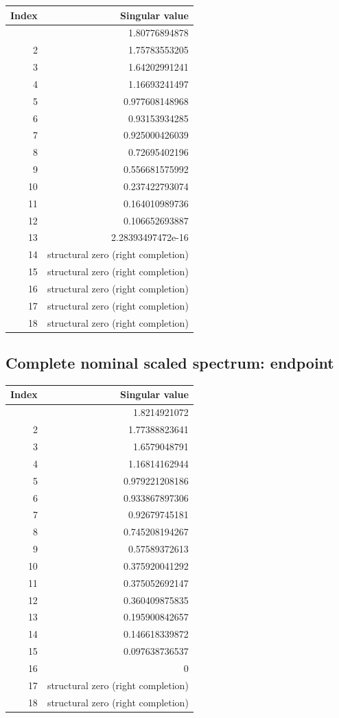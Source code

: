\documentclass[aps,prd,preprint,onecolumn,notitlepage]{revtex4-2}
\begin{document}
\begin{longtable}[]{@{}rr@{}}
\toprule\noalign{}
Index & Singular value \\
\midrule\noalign{}
\endhead
\bottomrule\noalign{}
\endlastfoot
1 & 1.80776894878 \\
2 & 1.75783553205 \\
3 & 1.64202991241 \\
4 & 1.16693241497 \\
5 & 0.977608148968 \\
6 & 0.93153934285 \\
7 & 0.925000426039 \\
8 & 0.72695402196 \\
9 & 0.556681575992 \\
10 & 0.237422793074 \\
11 & 0.164010989736 \\
12 & 0.106652693887 \\
13 & 2.28393497472e-16 \\
14 & structural zero (right completion) \\
15 & structural zero (right completion) \\
16 & structural zero (right completion) \\
17 & structural zero (right completion) \\
18 & structural zero (right completion) \\
\end{longtable}

\hypertarget{complete-nominal-scaled-spectrum-endpoint}{%
\subsection{Complete nominal scaled spectrum: endpoint}\label{complete-nominal-scaled-spectrum-endpoint}}

\begin{longtable}[]{@{}rr@{}}
\toprule\noalign{}
Index & Singular value \\
\midrule\noalign{}
\endhead
\bottomrule\noalign{}
\endlastfoot
1 & 1.8214921072 \\
2 & 1.77388823641 \\
3 & 1.6579048791 \\
4 & 1.16814162944 \\
5 & 0.979221208186 \\
6 & 0.933867897306 \\
7 & 0.92679745181 \\
8 & 0.745208194267 \\
9 & 0.57589372613 \\
10 & 0.375920041292 \\
11 & 0.375052692147 \\
12 & 0.360409875835 \\
13 & 0.195900842657 \\
14 & 0.146618339872 \\
15 & 0.097638736537 \\
16 & 0 \\
17 & structural zero (right completion) \\
18 & structural zero (right completion) \\
\end{longtable}
\end{document}
